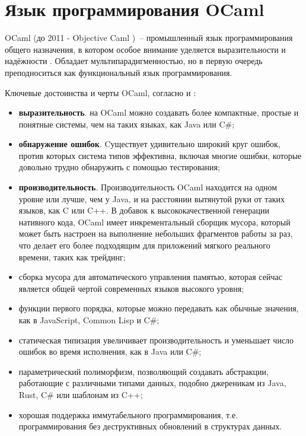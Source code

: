 \section{Язык программирования OCaml}

OCaml (до 2011 - Objective Caml \cite{camlhistory})~-- промышленный язык программирования общего назначения,
в котором особое внимание уделяется выразительности и надёжности \cite{ocamlorg}. Обладает
мультипарадигменностью, но в первую очередь преподноситься как функциональный язык программирования.

Ключевые достоинства и черты OCaml, согласно \cite[c.~3]{yaron2011} и \cite{rwo-prologue}:

\begin{itemize}
      \item \textbf{выразительность}. на OCaml можно создавать более компактные, простые и понятные системы,
            чем на таких языках, как Java или C\#;
      \item \textbf{обнаружение ошибок}. Cуществует удивительно
            широкий круг ошибок, против которых система типов эффективна, включая многие ошибки, которые довольно трудно
            обнаружить с помощью тестирования;
      \item \textbf{производительность}. Производительность OCaml находится на одном уровне или лучше,
            чем у Java, и на расстоянии вытянутой руки от таких языков, как C или C++. В добавок к высококачественной генерации нативного кода,
            OCaml имеет инкрементальный сборщик мусора, который может быть настроен на выполнение небольших
            фрагментов работы за раз, что делает его более подходящим для приложений мягкого реального времени,
            таких как трейдинг;
      \item сборка мусора для автоматического управления памятью, которая сейчас является общей чертой современных языков высокого уровня;
      \item функции первого порядка, которые можно передавать как обычные значения, как в JavaScript, Common Lisp и C\#;
      \item статическая типизация увеличивает производительность и уменьшает число ошибок во время исполнения, как в Java или C\#;
      \item параметрический полиморфизм, позволяющий создавать абстракции, работающие с различными типами данных,
            подобно джереникам из Java, Rust, C\# или шаблонам из C++;
      \item хорошая поддержка иммутабельного программирования, т.е. программирования без деструктивных обновлений в структурах данных.

\end{itemize}
